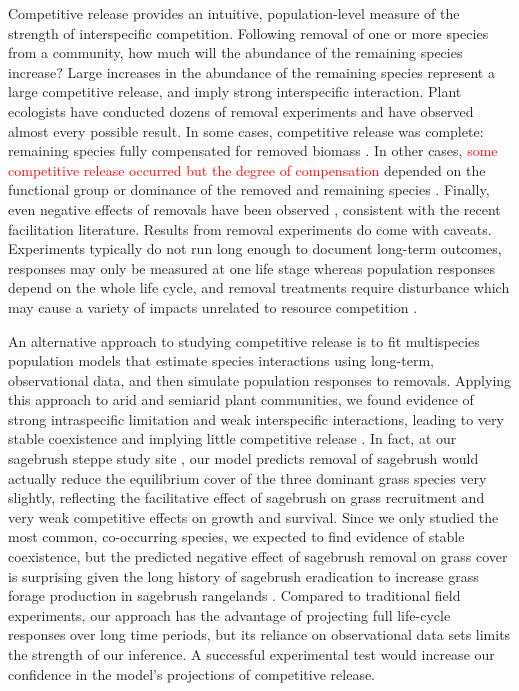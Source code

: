 \documentclass[11pt]{article}
\newcommand{\new}{\textcolor{red}}
\begin{document}
\begin{doublespacing}
Competitive release provides an intuitive, population-level measure of the strength of interspecific competition. Following removal of one or more species from a community, how much will the abundance of the remaining species increase? Large increases in the abundance of the remaining species represent a large competitive release, and imply strong interspecific interaction. Plant ecologists have conducted dozens of removal experiments and have observed almost every possible result. In some cases, competitive release was complete: remaining species fully compensated for removed biomass \citep{leps_nutrient_1999,jutila_effects_2002}. In other cases, \new{some competitive release occurred but the degree of compensation} depended on the functional group or dominance of the removed and remaining species \citep{sala_resource_1989,belsky_effects_1992,smith_dominant_2003}. Finally, even negative effects of removals have been observed \citep{keddy_effects_1989,gilbert_dominant_2009}, consistent with the recent facilitation literature. Results from removal experiments do come with caveats. Experiments typically do not run long enough to document long-term outcomes, responses may only be measured at one life stage whereas population responses depend on the whole life cycle, and removal treatments require disturbance which may cause a variety of impacts unrelated to resource competition \citep{aarssen_neighbour_1990}.

An alternative approach to studying competitive release is to fit multispecies population models that estimate species interactions using long-term, observational data, and then simulate population responses to removals. Applying this approach to arid and semiarid plant communities, we found evidence of strong intraspecific limitation and weak interspecific interactions, leading to very stable coexistence and implying little competitive release \citep{adler_coexistence_2010,chu_large_2015}. In fact, at our sagebrush steppe study site  \citep{adler_coexistence_2010}, our model predicts removal of sagebrush would actually reduce the equilibrium cover of the three dominant grass species very slightly, reflecting the facilitative effect of sagebrush on grass recruitment and very weak competitive effects on growth and survival.  Since we only studied the most common, co-occurring species, we expected to find evidence of stable coexistence, but the predicted negative effect of sagebrush removal on grass cover is surprising given the long history of sagebrush eradication to increase grass forage production in sagebrush rangelands \citep{Robertson1947,Mueggler1958,Cook1963}.
Compared to traditional field experiments, our approach has the advantage of projecting full life-cycle responses over long time periods, but its reliance on observational data sets limits the strength of our inference. A successful experimental test would increase our confidence in the model's projections of competitive release.


\end{doublespacing}
\end{document}
